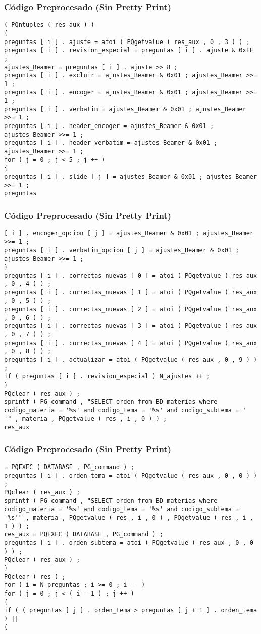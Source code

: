 \documentclass{beamer}
\begin{document}
\begin{frame}[fragile]
\frametitle{C\'odigo Preprocesado (Sin Pretty Print)}
\begin{lstlisting}[style=CStyle]
( PQntuples ( res_aux ) ) 
{ 
preguntas [ i ] . ajuste = atoi ( PQgetvalue ( res_aux , 0 , 3 ) ) ; 
preguntas [ i ] . revision_especial = preguntas [ i ] . ajuste & 0xFF ; 
ajustes_Beamer = preguntas [ i ] . ajuste >> 8 ; 
preguntas [ i ] . excluir = ajustes_Beamer & 0x01 ; ajustes_Beamer >>= 1 ; 
preguntas [ i ] . encoger = ajustes_Beamer & 0x01 ; ajustes_Beamer >>= 1 ; 
preguntas [ i ] . verbatim = ajustes_Beamer & 0x01 ; ajustes_Beamer >>= 1 ; 
preguntas [ i ] . header_encoger = ajustes_Beamer & 0x01 ; ajustes_Beamer >>= 1 ; 
preguntas [ i ] . header_verbatim = ajustes_Beamer & 0x01 ; ajustes_Beamer >>= 1 ; 
for ( j = 0 ; j < 5 ; j ++ ) 
{ 
preguntas [ i ] . slide [ j ] = ajustes_Beamer & 0x01 ; ajustes_Beamer >>= 1 ; 
preguntas \end{lstlisting}
\end{frame}
\begin{frame}[fragile]
\frametitle{C\'odigo Preprocesado (Sin Pretty Print)}
\begin{lstlisting}[style=CStyle]
[ i ] . encoger_opcion [ j ] = ajustes_Beamer & 0x01 ; ajustes_Beamer >>= 1 ; 
preguntas [ i ] . verbatim_opcion [ j ] = ajustes_Beamer & 0x01 ; ajustes_Beamer >>= 1 ; 
} 
preguntas [ i ] . correctas_nuevas [ 0 ] = atoi ( PQgetvalue ( res_aux , 0 , 4 ) ) ; 
preguntas [ i ] . correctas_nuevas [ 1 ] = atoi ( PQgetvalue ( res_aux , 0 , 5 ) ) ; 
preguntas [ i ] . correctas_nuevas [ 2 ] = atoi ( PQgetvalue ( res_aux , 0 , 6 ) ) ; 
preguntas [ i ] . correctas_nuevas [ 3 ] = atoi ( PQgetvalue ( res_aux , 0 , 7 ) ) ; 
preguntas [ i ] . correctas_nuevas [ 4 ] = atoi ( PQgetvalue ( res_aux , 0 , 8 ) ) ; 
preguntas [ i ] . actualizar = atoi ( PQgetvalue ( res_aux , 0 , 9 ) ) ; 
if ( preguntas [ i ] . revision_especial ) N_ajustes ++ ; 
} 
PQclear ( res_aux ) ; 
sprintf ( PG_command , "SELECT orden from BD_materias where codigo_materia = '%s' and codigo_tema = '%s' and codigo_subtema = '          '" , materia , PQgetvalue ( res , i , 0 ) ) ; 
res_aux \end{lstlisting}
\end{frame}
\begin{frame}[fragile]
\frametitle{C\'odigo Preprocesado (Sin Pretty Print)}
\begin{lstlisting}[style=CStyle]
= PQEXEC ( DATABASE , PG_command ) ; 
preguntas [ i ] . orden_tema = atoi ( PQgetvalue ( res_aux , 0 , 0 ) ) ; 
PQclear ( res_aux ) ; 
sprintf ( PG_command , "SELECT orden from BD_materias where codigo_materia = '%s' and codigo_tema = '%s' and codigo_subtema = '%s'" , materia , PQgetvalue ( res , i , 0 ) , PQgetvalue ( res , i , 1 ) ) ; 
res_aux = PQEXEC ( DATABASE , PG_command ) ; 
preguntas [ i ] . orden_subtema = atoi ( PQgetvalue ( res_aux , 0 , 0 ) ) ; 
PQclear ( res_aux ) ; 
} 
PQclear ( res ) ; 
for ( i = N_preguntas ; i >= 0 ; i -- ) 
for ( j = 0 ; j < ( i - 1 ) ; j ++ ) 
{ 
if ( ( preguntas [ j ] . orden_tema > preguntas [ j + 1 ] . orden_tema ) || 
( \end{lstlisting}
\end{frame}
\end{document}
